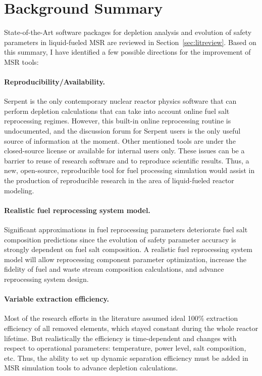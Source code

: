 \section{Background Summary}
State-of-the-Art software packages for depletion analysis and evolution of 
safety parameters in liquid-fueled \gls{MSR} are reviewed in 
Section~\ref{sec:litreview}. Based on this summary, I have identified a few 
possible directions for the improvement of \gls{MSR} tools:
\paragraph{Reproducibility/Availability.}
Serpent is the only contemporary nuclear reactor physics software that can 
perform depletion calculations that can take into account online fuel salt 
reprocessing regimes. However, this built-in online reprocessing routine is 
undocumented, and the discussion forum for Serpent users is the only useful 
source of information at the moment. Other mentioned tools are under the 
closed-source license or available for internal users only. These issues can 
be a barrier to reuse of research software and to reproduce scientific 
results. Thus, a new, open-source, reproducible tool for fuel processing 
simulation would assist in the production of reproducible research in the area 
of liquid-fueled reactor modeling.
\paragraph{Realistic fuel reprocessing system model.} 
Significant approximations in fuel reprocessing parameters deteriorate fuel 
salt composition predictions since the evolution of safety parameter accuracy 
is strongly dependent on fuel salt composition. A realistic fuel reprocessing 
system model will allow reprocessing component parameter optimization,  
increase the fidelity of fuel and waste stream composition calculations, and 
advance reprocessing system design.
\paragraph{Variable extraction efficiency.} Most of the research efforts in 
the literature assumed ideal 100\% extraction efficiency of all removed 
elements, which stayed constant during the whole reactor lifetime. But 
realistically the efficiency is time-dependent and changes with respect to 
operational parameters: temperature, power level, salt composition, etc. Thus, 
the ability to set up dynamic separation efficiency must be added in \gls{MSR} 
simulation tools to advance depletion calculations.
